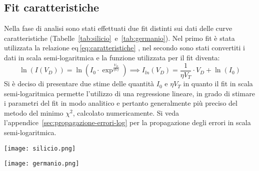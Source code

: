 \documentclass[@SRC@/main]{subfiles}
\begin{document}
  \subsection{Fit caratteristiche}
    Nella fase di analisi sono stati effettuati due fit distinti sui dati delle curve
    caratteristiche (Tabelle~\ref{tab:silicio}~e~\ref{tab:germanio}).
    Nel primo fit è stata utilizzata la relazione eq\,\eqref{eq:caratteristiche}
        , nel secondo sono stati convertiti i dati in
        scala semi-logaritmica e la funzione utilizzata per il fit diventa:
    \vspace{0.5cm}
    \begin{equation*}
      \ln  (I(V_D)) = \ln \left( I_0 \cdot \exp^{\frac{V_D}{\eta V_T}} \right) \implies
      I_{ln}(V_D) = \frac{1}{\eta V_T} \cdot V_D + \ln (I_0)
    \end{equation*}
    \newpage
    \noindent Si è deciso di presentare due stime delle quantità $I_{0}$ e $\eta V_{T}$
    in quanto il fit in scala semi-logaritmica
    permette l'utilizzo di una regressione lineare, in grado di stimare i parametri del fit in modo analitico e
    pertanto
    generalmente più preciso del metodo del minimo $\chi^2$, calcolato numericamente.
    Si veda l'appendice~\ref{sec:propagazione-errori-log} per la propagazione degli
    errori in scala semi-logaritmica.
    \vspace{4pt}
    \newline
    \begin{center}
      \begin{minipage}{.95\textwidth}
        \centering
        \texttt{[image: silicio.png]}
        \label{fig:silicio}
      \end{minipage}
    \end{center}
    \vspace{0.5pt}
    \begin{center}
      \begin{minipage}[t]{.95\textwidth}
        \centering
        \texttt{[image: germanio.png]}
        \label{fig:germanio}
      \end{minipage}
    \end{center}
    \vspace{1.5cm}
\end{document}
